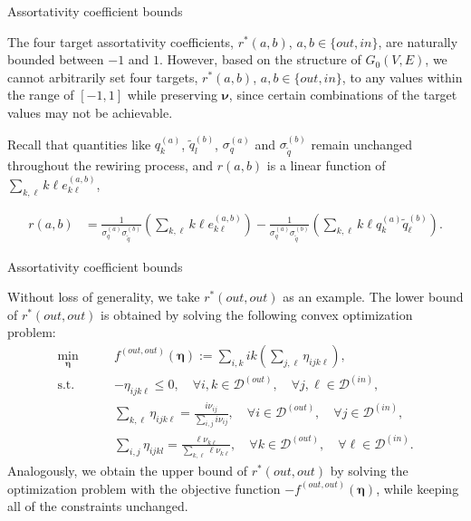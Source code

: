 \documentclass[xcolor=dvipsnames, compress, 10pt]{beamer}
\theoremstyle{remark}
\newcommand{\tq}{\tilde{q}}
\begin{document}

\begin{frame}{Assortativity coefficient bounds}

The four target assortativity coefficients, $r^*(a, b)$, 
$a, b \in \{out, in\}$, are naturally bounded
between $-1$ and $1$. 
However, based on the structure of $G_0(V, E)$, 
we cannot arbitrarily set four targets, $r^*(a, b)$, $a, b \in 
\{out, in\}$, to any values within the range of $[-1, 1]$ while 
preserving $\bm{\nu}$, since certain combinations of the target values 
may not be achievable. 

\vspace{0.2cm}

Recall that quantities like $q_k^{(a)}$, $\tq_l^{(b)}$, 
$\sigma_q^{(a)}$ and $\sigma_{\tq}^{(b)}$ 
remain unchanged throughout the rewiring process, and
$r(a, b)$ is a linear function of 
$\sum_{k, \ell} k\ell e^{\left(a, b\right)}_{k\ell}$,

\begin{align*}
	r(a, b) &= \frac{1}{\sigma_q^{(a)} \sigma_{\tq}^{(b)}} 
		\left(\sum_{k,\ell} k\ell e^{(a,b)}_{k\ell}\right) - 
	\frac{1}{\sigma_q^{(a)} \sigma_{\tq}^{(b)}} 
		\left(\sum_{k,\ell} k\ell q_k^{(a)} \tq_\ell^{(b)}\right).
\end{align*}

\end{frame}



\begin{frame}{Assortativity coefficient bounds}

Without loss of generality, we take 
$r^*(out, out)$ as an example. The lower bound of $r^*(out, out)$ is obtained
by solving the following convex optimization problem:
\begin{align*}
	\min_{\bm{\eta}} \qquad &
	f^{(out,out)}(\bm{\eta}) := \sum_{i, k}ik 
	\left(\sum_{j, \ell} \eta_{ijk\ell}\right),
	\\ \textrm{s.t.} \qquad & -\eta_{ijk\ell} \le 0, 
	\quad \forall i,k \in \mathcal{D}^{(out)}, 
	\quad \forall j,\ell \in \mathcal{D}^{(in)}, 
	\\ &\sum_{k, \ell} \eta_{ijk\ell} = 
	\frac{i \nu_{ij}}{\sum_{i, j} i \nu_{ij}},
	\quad \forall i \in \mathcal{D}^{(out)}, 
	\quad \forall j \in \mathcal{D}^{(in)},
	\\ &\sum_{i, j} \eta_{ijkl} = 
	\frac{\ell \nu_{k\ell}}{\sum_{k, \ell} \ell \nu_{k\ell}},
	\quad \forall k \in \mathcal{D}^{(out)}, 
	\quad \forall \ell \in \mathcal{D}^{(in)}.
\end{align*}
Analogously, we obtain the upper bound of $r^{*}(out, out)$ by 
solving the optimization problem with the objective function 
$-f^{(out, out)}(\bm{\eta})$, while keeping all of the
constraints unchanged.
	
	
\end{frame}
\end{document}
